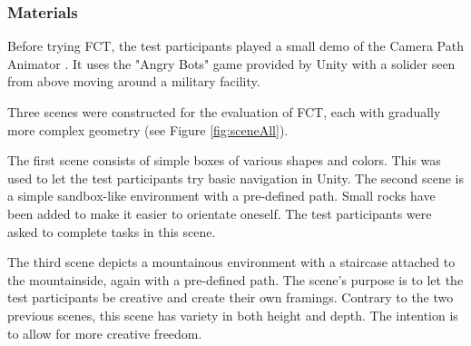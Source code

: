 \subsubsection{Materials}
Before trying FCT, the test participants played a small demo of the Camera Path Animator \cite{unity_camTool}. It uses the "Angry Bots" game provided by Unity \cite{angryBots} with a solider seen from above moving around a military facility.

Three scenes were constructed for the evaluation of FCT, each with gradually more complex geometry (see Figure \ref{fig:sceneAll}). 

The first scene consists of simple boxes of various shapes and colors. This was used to let the test participants try basic navigation in Unity.
The second scene is a simple sandbox-like environment with a pre-defined path. Small rocks have been added to make it easier to orientate oneself. The test participants were asked to complete tasks in this scene.

The third scene depicts a mountainous environment with a staircase attached to the mountainside, again with a pre-defined path. The scene's purpose is to let the test participants be creative and create their own framings. Contrary to the two previous scenes, this scene has variety in both height and depth. The intention is to allow for more creative freedom.

